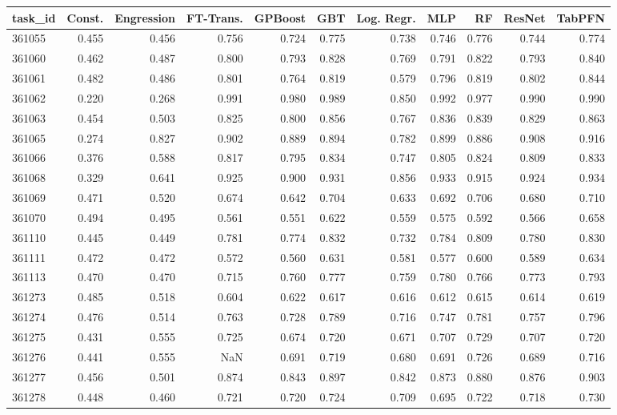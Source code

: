 \begin{tabular}{lrrrrrrrrrr}
\toprule
task\_id & Const. & Engression & FT-Trans. & GPBoost & GBT & Log. Regr. & MLP & RF & ResNet & TabPFN \\
\midrule
361055 & 0.455 & 0.456 & 0.756 & 0.724 & 0.775 & 0.738 & 0.746 & 0.776 & 0.744 & 0.774 \\
361060 & 0.462 & 0.487 & 0.800 & 0.793 & 0.828 & 0.769 & 0.791 & 0.822 & 0.793 & 0.840 \\
361061 & 0.482 & 0.486 & 0.801 & 0.764 & 0.819 & 0.579 & 0.796 & 0.819 & 0.802 & 0.844 \\
361062 & 0.220 & 0.268 & 0.991 & 0.980 & 0.989 & 0.850 & 0.992 & 0.977 & 0.990 & 0.990 \\
361063 & 0.454 & 0.503 & 0.825 & 0.800 & 0.856 & 0.767 & 0.836 & 0.839 & 0.829 & 0.863 \\
361065 & 0.274 & 0.827 & 0.902 & 0.889 & 0.894 & 0.782 & 0.899 & 0.886 & 0.908 & 0.916 \\
361066 & 0.376 & 0.588 & 0.817 & 0.795 & 0.834 & 0.747 & 0.805 & 0.824 & 0.809 & 0.833 \\
361068 & 0.329 & 0.641 & 0.925 & 0.900 & 0.931 & 0.856 & 0.933 & 0.915 & 0.924 & 0.934 \\
361069 & 0.471 & 0.520 & 0.674 & 0.642 & 0.704 & 0.633 & 0.692 & 0.706 & 0.680 & 0.710 \\
361070 & 0.494 & 0.495 & 0.561 & 0.551 & 0.622 & 0.559 & 0.575 & 0.592 & 0.566 & 0.658 \\
361110 & 0.445 & 0.449 & 0.781 & 0.774 & 0.832 & 0.732 & 0.784 & 0.809 & 0.780 & 0.830 \\
361111 & 0.472 & 0.472 & 0.572 & 0.560 & 0.631 & 0.581 & 0.577 & 0.600 & 0.589 & 0.634 \\
361113 & 0.470 & 0.470 & 0.715 & 0.760 & 0.777 & 0.759 & 0.780 & 0.766 & 0.773 & 0.793 \\
361273 & 0.485 & 0.518 & 0.604 & 0.622 & 0.617 & 0.616 & 0.612 & 0.615 & 0.614 & 0.619 \\
361274 & 0.476 & 0.514 & 0.763 & 0.728 & 0.789 & 0.716 & 0.747 & 0.781 & 0.757 & 0.796 \\
361275 & 0.431 & 0.555 & 0.725 & 0.674 & 0.720 & 0.671 & 0.707 & 0.729 & 0.707 & 0.720 \\
361276 & 0.441 & 0.555 & NaN & 0.691 & 0.719 & 0.680 & 0.691 & 0.726 & 0.689 & 0.716 \\
361277 & 0.456 & 0.501 & 0.874 & 0.843 & 0.897 & 0.842 & 0.873 & 0.880 & 0.876 & 0.903 \\
361278 & 0.448 & 0.460 & 0.721 & 0.720 & 0.724 & 0.709 & 0.695 & 0.722 & 0.718 & 0.730 \\

\end{tabular}
